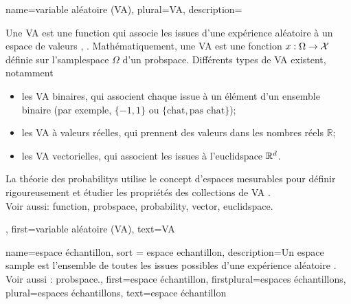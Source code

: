 {name={variable aléatoire (VA)}, plural={VA},
	description={Une VA est une \gls{function} qui associe les issues d’une expérience aléatoire à un espace de valeurs \cite{BillingsleyProbMeasure}, \cite{GrayProbBook}. 
		Mathématiquement, une VA est une fonction $x: \Omega \rightarrow \mathcal{X}$ définie sur l'\gls{samplespace} $\Omega$ d’un \gls{probspace}. 
		Différents types de VA existent, notamment  
		\begin{itemize} 
			\item {les VA binaires}, qui associent chaque issue à un élément d’un ensemble binaire (par exemple, $\{-1,1\}$ ou $\{\text{chat}, \text{pas chat}\}$); 
			\item {les VA à valeurs réelles}, qui prennent des valeurs dans les nombres réels $\mathbb{R}$;  
			\item {les VA vectorielles}, qui associent les issues à l’\gls{euclidspace} $\mathbb{R}^{d}$.  
		\end{itemize} 
		La théorie des \glspl{probability} utilise le concept d’espaces mesurables pour définir rigoureusement 
		et étudier les propriétés des collections de VA \cite{BillingsleyProbMeasure}.
		\\
		Voir aussi: \gls{function}, \gls{probspace}, \gls{probability}, \gls{vector}, \gls{euclidspace}.}, 
	first={variable aléatoire (VA)},
	text={VA}  
}

{name={espace échantillon}, sort = {espace echantillon}, 
	description={Un espace \gls{sample} est l’ensemble de toutes les issues possibles d’une expérience aléatoire \cite{papoulis,BillingsleyProbMeasure,AshProbMeasure,BertsekasProb}. 
	\\	
	Voir aussi : \gls{probspace}.},  
	first={espace échantillon}, 
	firstplural={espaces échantillons},
	plural={espaces échantillons},
	text={espace échantillon}
}


